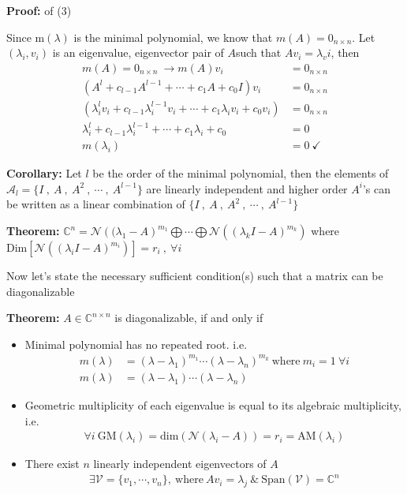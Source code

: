 \documentclass[twoside]{article}
\begin{document}
\textbf{Proof:} of (3) 

Since m$(\lambda)$ is the minimal polynomial, we know that $m(A) = 0_{n \times n}$. Let $(\lambda_i , v_i)$ is an eigenvalue, eigenvector pair of $A$such that $A v_i = \lambda_vi$, then
%
\begin{align*}
m(A) = 0_{n \times n} \ \rightarrow m(A) v_i &= 0_{n \times n} 
\\
\left( A^l + c_{l-1} A^{l-1} + \cdots + c_1 A + c_0 I \right) v_i &= 0_{n \times n} 
\\
\left( \lambda_i^l v_i + c_{l-1} \lambda_i^{l-1} v_i  + \cdots + c_1 \lambda_i v_i + c_0  v_i \right)  &= 0_{n \times n} 
\\
 \lambda_i^l  + c_{l-1} \lambda_i^{l-1}   + \cdots + c_1 \lambda_i  + c_0   &= 0
 \\
m(\lambda_i)  &= 0 \ \checkmark
\end{align*}

\textbf{Corollary:} Let $l$ be the order of the minimal polynomial, then the elements of $\mathcal{A}_l = \lbrace I \ , \ A \ , \ A^2 \ , \ \cdots \ , \ A^{l-1} \rbrace$ 
are linearly independent and higher order $A^i$'s can be written as a linear combination of $\lbrace I \ , \ A \ , \ A^2 \ , \ \cdots \ , \ A^{l-1} \rbrace$  

\vspace{6pt}

\textbf{Theorem:} $\mathbb{C}^{n} = \mathcal{N}\left( (\lambda_1 - A \right)^{m_1} \bigoplus \cdots \bigoplus \mathcal{N}\left( (\lambda_k I - A )^{m_k} \right) $ where $\mathrm{Dim} \left[  \mathcal{N}\left( (\lambda_i I - A )^{m_i} \right) \right] = r_i \ , \ \forall i$

\vspace{6pt}

Now let's state the necessary sufficient condition(s) such that a matrix can be diagonalizable 

\textbf{Theorem:} $A \in \mathbb{C}^{n \times n}$ is diagonalizable, if and only if 
\begin{itemize}
	\item Minimal polynomial has no repeated root. i.e.
	\begin{align*}
m(\lambda) &= (\lambda - \lambda_1)^{m_1} \cdots (\lambda - \lambda_n)^{m_k}  \ \mathrm{where} \ m_i = 1 \ \forall i 
\\  m(\lambda) &= (\lambda - \lambda_1) \cdots (\lambda - \lambda_n) 
\end{align*}
%
\item Geometric multiplicity of each eigenvalue is equal to its algebraic multiplicity, i.e.
\begin{align*}
\forall i \ \mathrm{GM}(\lambda_i) = \mathrm{dim}\left( \mathcal{N}(\lambda_i - A) \right) = r_i = \mathrm{AM}(\lambda_i) 
\end{align*}
%
\item There exist $n$ linearly independent eigenvectors of $A$
\begin{align*}
\exists \mathcal{V} = \lbrace v_1 , \cdots , v_n \rbrace, \ \mathrm{where} \ A v_i = \lambda_j \ \& \ \mathrm{Span}(\mathcal{V}) = \mathbb{C}^n
\end{align*}
\end{itemize}
\end{document}
